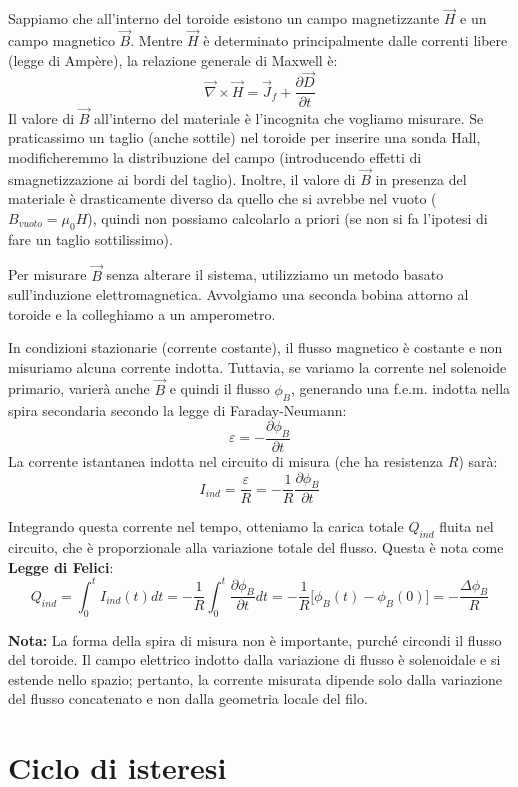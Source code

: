 \documentclass{book}
\begin{document}
Sappiamo che all'interno del toroide esistono un campo magnetizzante $\vec{H}$ e un campo magnetico $\vec{B}$.
Mentre $\vec{H}$ è determinato principalmente dalle correnti libere (legge di Ampère), la relazione generale di Maxwell è:
$$
\vec{\nabla} \times \vec{H} = \vec{J}_f + \frac{\partial\vec{D}}{\partial t}
$$
Il valore di $\vec{B}$ all'interno del materiale è l'incognita che vogliamo misurare.
Se praticassimo un taglio (anche sottile) nel toroide per inserire una sonda Hall, modificheremmo la distribuzione del campo (introducendo effetti di smagnetizzazione ai bordi del taglio). Inoltre, il valore di $\vec{B}$ in presenza del materiale è drasticamente diverso da quello che si avrebbe nel vuoto ($B_{vuoto}=\mu_0 H$), quindi non possiamo calcolarlo a priori (se non si fa l'ipotesi di fare un taglio sottilissimo).

Per misurare $\vec{B}$ senza alterare il sistema, utilizziamo un metodo basato sull'induzione elettromagnetica. Avvolgiamo una seconda bobina attorno al toroide e la colleghiamo a un amperometro.

In condizioni stazionarie (corrente costante), il flusso magnetico è costante e non misuriamo alcuna corrente indotta. Tuttavia, se variamo la corrente nel solenoide primario, varierà anche $\vec{B}$ e quindi il flusso $\phi_B$, generando una f.e.m. indotta nella spira secondaria secondo la legge di Faraday-Neumann:
$$
\varepsilon = - \frac{\partial \phi_B}{\partial t}
$$
La corrente istantanea indotta nel circuito di misura (che ha resistenza $R$) sarà:
$$
I_{ind} = \frac{\varepsilon}{R} = - \frac{1}{R} \frac{\partial \phi_B}{\partial t}
$$

Integrando questa corrente nel tempo, otteniamo la carica totale $Q_{ind}$ fluita nel circuito, che è proporzionale alla variazione totale del flusso. Questa è nota come \textbf{Legge di Felici}:
$$
Q_{ind} = \int_0^t I_{ind}(t)dt = -\frac{1}{R} \int_0^t \frac{\partial \phi_B}{\partial t}dt = - \frac{1}{R} \big[\phi_B(t)-\phi_B(0)\big] = -\frac{\Delta \phi_B}{R}
$$

\textbf{Nota:} La forma della spira di misura non è importante, purché circondi il flusso del toroide. Il campo elettrico indotto dalla variazione di flusso è solenoidale e si estende nello spazio; pertanto, la corrente misurata dipende solo dalla variazione del flusso concatenato e non dalla geometria locale del filo.

\section{Ciclo di isteresi}
\end{document}
